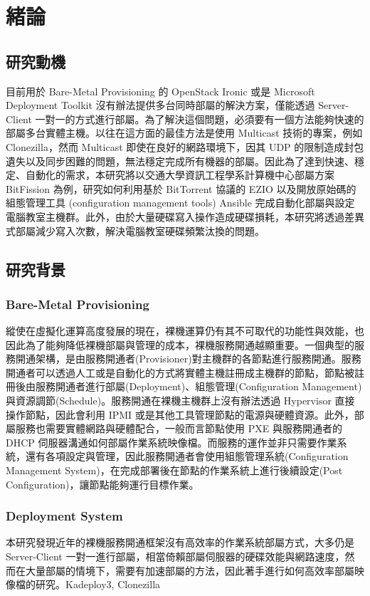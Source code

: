 \chapter{緒論}
\label{c:intro}
\section{研究動機}

目前用於 Bare-Metal Provisioning 的 OpenStack Ironic 或是 Microsoft Deployment Toolkit 沒有辦法提供多台同時部屬的解決方案，僅能透過 Server-Client 一對一的方式進行部屬。為了解決這個問題，必須要有一個方法能夠快速的部屬多台實體主機。以往在這方面的最佳方法是使用 Multicast 技術的專案，例如 Clonezilla\cite{shiau2008clonezilla}，然而 Multicast 即使在良好的網路環境下，因其 UDP 的限制造成封包遺失以及同步困難的問題，無法穩定完成所有機器的部屬。因此為了達到快速、穩定、自動化的需求，本研究將以交通大學資訊工程學系計算機中心部屬方案 BitFission 為例，研究如何利用基於 BitTorrent 協議的 EZIO 以及開放原始碼的組態管理工具 (configuration management tools) Ansible 完成自動化部屬與設定電腦教室主機群。此外，由於大量硬碟寫入操作造成硬碟損耗，本研究將透過差異式部屬減少寫入次數，解決電腦教室硬碟頻繁汰換的問題。

\section{研究背景}
\subsection{Bare-Metal Provisioning}
縱使在虛擬化運算高度發展的現在，裸機運算仍有其不可取代的功能性與效能，也因此為了能夠降低裸機部屬與管理的成本，裸機服務開通越顯重要。一個典型的服務開通架構，是由服務開通者(Provisioner)對主機群的各節點進行服務開通。服務開通者可以透過人工或是自動化的方式將實體主機註冊成主機群的節點，節點被註冊後由服務開通者進行部屬(Deployment)、組態管理(Configuration Management)與資源調節(Schedule)。服務開通在裸機主機群上沒有辦法透過 Hypervisor 直接操作節點，因此會利用 IPMI 或是其他工具管理節點的電源與硬體資源。此外，部屬服務也需要實體網路與硬體配合，一般而言節點使用 PXE 與服務開通者的 DHCP 伺服器溝通如何部屬作業系統映像檔。而服務的運作並非只需要作業系統，還有各項設定與管理，因此服務開通者會使用組態管理系統(Configuration Management System)，在完成部署後在節點的作業系統上進行後續設定(Post Configuration)，讓節點能夠運行目標作業。
\subsection{Deployment System}
本研究發現近年的裸機服務開通框架\cite{chandrasekar2014comparative}沒有高效率的作業系統部屬方式，大多仍是 Server-Client 一對一進行部屬，相當倚賴部屬伺服器的硬碟效能與網路速度，然而在大量部屬的情境下，需要有加速部屬的方法，因此著手進行如何高效率部屬映像檔的研究。Kadeploy3\cite{kadeploy3}, Clonezilla\cite{shiau2008clonezilla}
